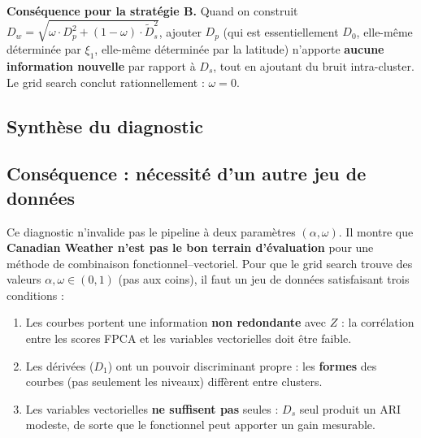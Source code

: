 \documentclass[11pt, a4paper]{article}
\newcommand{\Dp}{D_p}
\newcommand{\Dw}{D_w}
\theoremstyle{definition}
\theoremstyle{remark}
\begin{document}
\textbf{Conséquence pour la stratégie B.} Quand on construit
$\Dw = \sqrt{\omega \cdot \Dp^2 + (1-\omega) \cdot \tilde{D}_s^2}$, ajouter
$\Dp$ (qui est essentiellement $D_0$, elle-même déterminée par $\xi_1$,
elle-même déterminée par la latitude) n'apporte \textbf{aucune information
nouvelle} par rapport à $D_s$, tout en ajoutant du bruit intra-cluster.
Le grid search conclut rationnellement : $\omega = 0$.

\subsection{Synthèse du diagnostic}

\begin{center}
\end{center}

\subsection{Conséquence : nécessité d'un autre jeu de données}

Ce diagnostic n'invalide pas le pipeline à deux paramètres $(\alpha, \omega)$.
Il montre que \textbf{Canadian Weather n'est pas le bon terrain d'évaluation}
pour une méthode de combinaison fonctionnel–vectoriel. Pour que le grid search
trouve des valeurs $\alpha, \omega \in (0, 1)$ (pas aux coins), il faut un jeu
de données satisfaisant trois conditions :
\begin{enumerate}
  \item Les courbes portent une information \textbf{non redondante} avec $Z$ :
    la corrélation entre les scores FPCA et les variables vectorielles doit être
    faible.
  \item Les dérivées ($D_1$) ont un pouvoir discriminant propre : les
    \textbf{formes} des courbes (pas seulement les niveaux) diffèrent entre
    clusters.
  \item Les variables vectorielles \textbf{ne suffisent pas} seules : $D_s$
    seul produit un ARI modeste, de sorte que le fonctionnel peut apporter
    un gain mesurable.
\end{enumerate}
\end{document}
